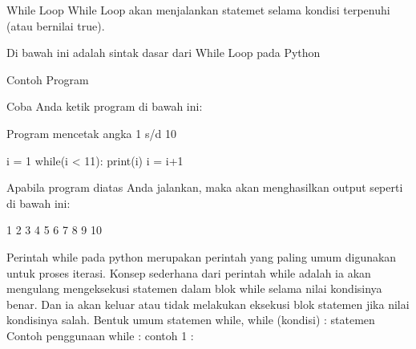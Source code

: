 While Loop 
While Loop akan menjalankan statemet selama kondisi terpenuhi (atau bernilai true).

Di bawah ini adalah sintak dasar dari While Loop pada Python

Contoh Program

Coba Anda ketik program di bawah ini:

 
Program mencetak angka 1 s/d 10 

i = 1 
while(i < 11): 
 print(i) 
 i = i+1 

Apabila program diatas Anda jalankan, maka akan menghasilkan output seperti di bawah ini:

 
1 
2 
3 
4 
5 
6 
7 
8 
9 
10 

Perintah while pada python merupakan perintah yang paling umum digunakan untuk proses
iterasi. Konsep sederhana dari perintah while adalah ia akan mengulang mengeksekusi statemen dalam
blok while selama nilai kondisinya benar. Dan ia akan keluar atau tidak melakukan eksekusi blok
statemen jika nilai kondisinya salah.
 Bentuk umum statemen while,
 while (kondisi) :
 statemen
 Contoh penggunaan while :
contoh 1 : 
